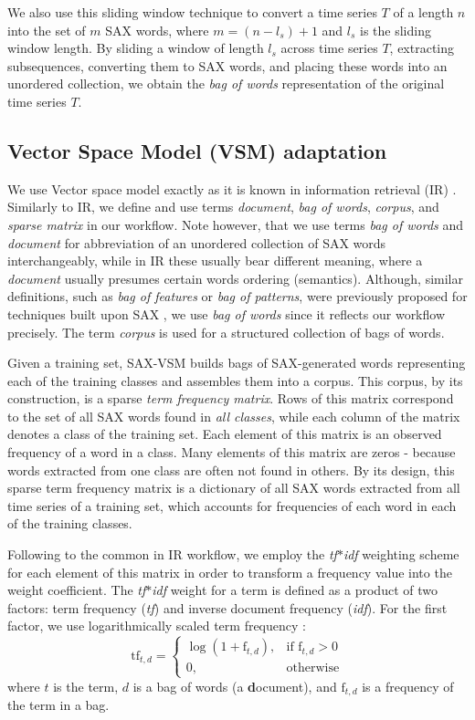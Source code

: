 \documentclass[conference]{IEEEtran}
\begin{document}
We also use this sliding window technique to convert a time series $T$ of a length $n$ into 
the set of $m$ SAX words, where $m=(n-l_{s})+1$ and $l_{s}$ is the sliding window length. 
By sliding a window of length $l_{s}$ across time series $T$, extracting subsequences, 
converting them to SAX words, and placing these words into an unordered collection, 
we obtain the \textit{bag of words} representation of the original time series $T$.

\subsection{Vector Space Model (VSM) adaptation}
We use Vector space model exactly as it is known in information retrieval (IR) \cite{salton}. 
Similarly to IR, we define and use terms \textit{document}, \textit{bag of words}, 
\textit{corpus}, and \textit{sparse matrix} in our workflow. 
Note however, that we use terms \textit{bag of words} and \textit{document} 
for abbreviation of an unordered collection of SAX words interchangeably, while 
in IR these usually bear different meaning, where a \textit{document} usually 
presumes certain words ordering (semantics). 
Although, similar definitions, such as \textit{bag of features} or 
\textit{bag of patterns}, were previously proposed for techniques built upon 
SAX \cite{bag_patterns}, we use \textit{bag of words} since it reflects our 
workflow precisely. The term \textit{corpus} is used for a structured collection 
of bags of words. 

Given a training set, SAX-VSM builds bags of SAX-generated words representing 
each of the training classes and assembles them into a corpus. 
This corpus, by its construction, is a sparse \textit{term frequency matrix}. 
Rows of this matrix correspond to the set of all SAX words found in 
\textit{all classes}, while each column of the matrix denotes a class of the 
training set. Each element of this matrix is an observed frequency of a word
in a class. 
Many elements of this matrix are zeros - because words extracted from one class 
are often not found in others.
By its design, this sparse 
term frequency matrix is a dictionary of all SAX words extracted from all time 
series of a training set, which accounts for frequencies of each word in each of 
the training classes.

Following to the common in IR workflow, we employ the \textit{tf$\ast$idf} weighting 
scheme for each element of this matrix in order to transform a frequency value into
the weight coefficient. 
The \textit{tf$\ast$idf} weight for a term is defined as a 
product of two factors: term frequency (\textit{tf}) and inverse document 
frequency (\textit{idf}). 
For the first factor, we use logarithmically scaled term frequency \cite{logtf}:
\begin{equation}
 \mbox{tf}_{t, d} =  \begin{cases} \log(1 + \mbox{f}_{t,d}), &\mbox{if f}_{t,d}>0  \\
0, & \mbox{otherwise} \end{cases}
\end{equation} 
where $t$ is the term, $d$ is a bag of words (a \textbf{d}ocument), and $\mbox{f}_{t,d}$ 
is a frequency of the term in a bag.
\end{document}
